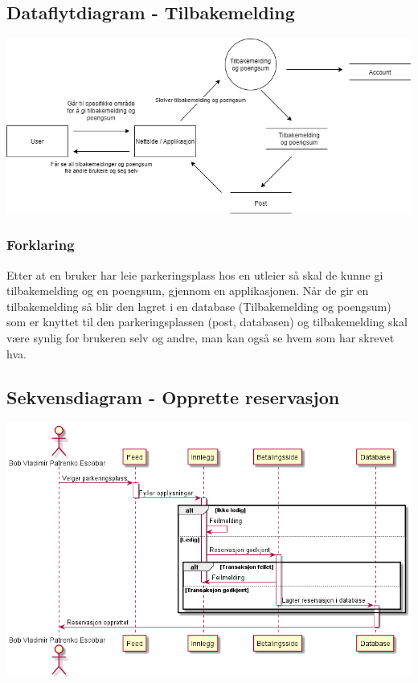\documentclass[12pt]{article}
\begin{document}
    \subsection{Dataflytdiagram - Tilbakemelding}
    \includegraphics[max width=\textwidth]{bilder/diagrammer/dataflyt_tilbakemelding.png}
        \subsubsection{Forklaring}
        Etter at en bruker har leie parkeringsplass hos en utleier så skal de kunne gi tilbakemelding og en poengsum, gjennom en applikasjonen. Når de gir en tilbakemelding så blir den lagret i en database (Tilbakemelding og poengsum) som er knyttet til den parkeringsplassen (post, databasen) og tilbakemelding skal være synlig for brukeren selv og andre, man kan også se hvem som har skrevet hva.

    \subsection{Sekvensdiagram - Opprette reservasjon}
    \includegraphics[max width=\textwidth]{bilder/diagrammer/sekvens_opprette reservasjon.png}
\end{document}
